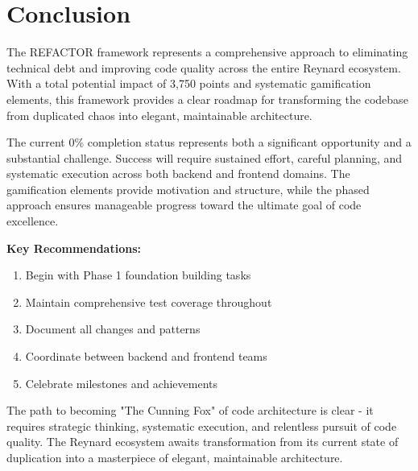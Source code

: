 \documentclass[10pt]{article}
\begin{document}
\section{Conclusion}

The REFACTOR framework represents a comprehensive approach to eliminating technical debt and improving code quality across the entire Reynard ecosystem. With a total potential impact of 3,750 points and systematic gamification elements, this framework provides a clear roadmap for transforming the codebase from duplicated chaos into elegant, maintainable architecture.

The current 0\% completion status represents both a significant opportunity and a substantial challenge. Success will require sustained effort, careful planning, and systematic execution across both backend and frontend domains. The gamification elements provide motivation and structure, while the phased approach ensures manageable progress toward the ultimate goal of code excellence.

\textbf{Key Recommendations:}
\begin{enumerate}
    \item Begin with Phase 1 foundation building tasks
    \item Maintain comprehensive test coverage throughout
    \item Document all changes and patterns
    \item Coordinate between backend and frontend teams
    \item Celebrate milestones and achievements
\end{enumerate}

The path to becoming "The Cunning Fox" of code architecture is clear - it requires strategic thinking, systematic execution, and relentless pursuit of code quality. The Reynard ecosystem awaits transformation from its current state of duplication into a masterpiece of elegant, maintainable architecture.
\end{document}
